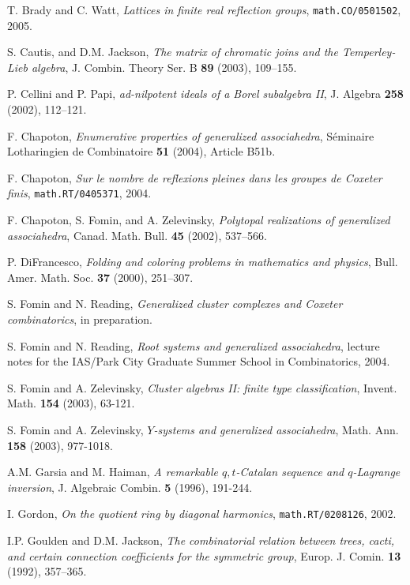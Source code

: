 \documentclass[12pt,letterpaper, reqno]{amsart}
\begin{document}
\begin{thebibliography}{99}
T. Brady and C. Watt, \emph{Lattices in finite real reflection groups}, \texttt{math.CO/0501502}, 2005.

S. Cautis, and D.M. Jackson, \emph{The matrix of chromatic joins and the Temperley-Lieb algebra}, J. Combin. Theory Ser. B {\bf 89} (2003), 109--155.

P. Cellini and P. Papi, \emph{ad-nilpotent ideals of a Borel subalgebra II}, J. Algebra {\bf 258} (2002), 112--121.

F. Chapoton, \emph{Enumerative properties of generalized associahedra}, S\'eminaire Lotharingien de Combinatoire {\bf 51} (2004), Article B51b.

F. Chapoton, \emph{Sur le nombre de reflexions pleines dans les groupes de Coxeter finis}, \texttt{math.RT/0405371}, 2004.

F. Chapoton, S. Fomin, and A. Zelevinsky, \emph{Polytopal realizations of generalized associahedra}, Canad. Math. Bull. {\bf 45} (2002), 537--566.

P.  DiFrancesco, \emph{Folding and coloring problems in mathematics and physics}, Bull.  Amer. Math. Soc. {\bf 37} (2000), 251--307.

S. Fomin and N. Reading, \emph{Generalized cluster complexes and Coxeter combinatorics}, in preparation.

S. Fomin and N. Reading, \emph{Root systems and generalized associahedra}, lecture notes for the IAS/Park City Graduate Summer School in Combinatorics, 2004.

S. Fomin and A. Zelevinsky, \emph{Cluster algebras II: finite type classification}, Invent. Math. {\bf 154} (2003), 63-121.

S. Fomin and A. Zelevinsky, \emph{$Y$-systems and generalized associahedra}, Math. Ann. {\bf 158} (2003), 977-1018.

A.M. Garsia and M. Haiman, \emph{A remarkable $q,t$-Catalan sequence and $q$-Lagrange inversion}, J. Algebraic Combin. {\bf 5} (1996), 191-244.

I. Gordon, \emph{On the quotient ring by diagonal harmonics}, \texttt{math.RT/0208126}, 2002.

I.P. Goulden and D.M. Jackson, \emph{The combinatorial relation between trees, cacti, and certain connection coefficients for the symmetric group}, Europ. J. Comin. {\bf 13} (1992), 357--365.


\end{thebibliography}
\end{document}
